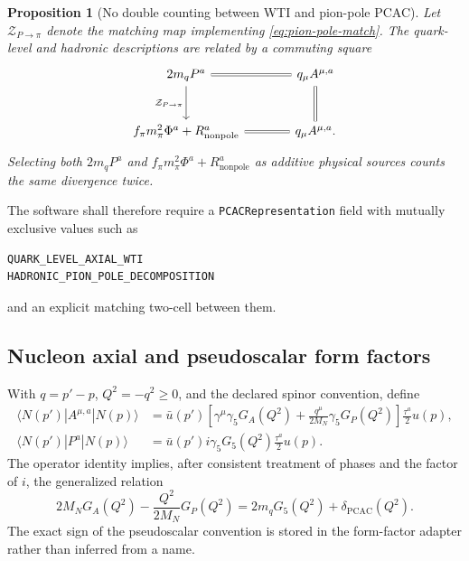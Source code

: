\documentclass[11pt]{article}
\newtheorem{proposition}[definition]{Proposition}
\newcommand{\cZ}{\mathcal Z}
\begin{document}
\begin{proposition}[No double counting between WTI and pion-pole PCAC]
Let \(\cZ_{P\to\pi}\) denote the matching map implementing
\cref{eq:pion-pole-match}.  The quark-level and hadronic descriptions are
related by a commuting square
\begin{equation}
\begin{tikzcd}[column sep=large,row sep=large]
 2m_q P^a \arrow[r,equal] \arrow[d,"\cZ_{P\to\pi}"']
 & q_{\mu}A^{\mu,a} \arrow[d,equal]\\
 f_{\pi}m_{\pi}^{2}\Phi^a+R_{\mathrm{nonpole}}^a
 \arrow[r,equal]
 & q_{\mu}A^{\mu,a}.
\end{tikzcd}
\end{equation}
Selecting both \(2m_qP^a\) and
\(f_{\pi}m_{\pi}^{2}\Phi^a+R_{\mathrm{nonpole}}^a\) as additive physical
sources counts the same divergence twice.
\end{proposition}

The software shall therefore require a
\texttt{PCACRepresentation} field with mutually exclusive values such as
\begin{verbatim}
QUARK_LEVEL_AXIAL_WTI
HADRONIC_PION_POLE_DECOMPOSITION
\end{verbatim}
and an explicit matching two-cell between them.

\subsection{Nucleon axial and pseudoscalar form factors}

With \(q=p'-p\), \(Q^2=-q^2\ge0\), and the declared spinor convention,
define
\begin{align}
 \langle N(p')|A^{\mu,a}|N(p)\rangle
 &={}
 \bar u(p')
 \left[
 \gamma^{\mu}\gamma_5 G_A(Q^2)
 +\frac{q^{\mu}}{2M_N}\gamma_5 G_P(Q^2)
 \right]
 \frac{\tau^a}{2}u(p),
 \\
 \langle N(p')|P^a|N(p)\rangle
 &={}
 \bar u(p')i\gamma_5
 G_5(Q^2)
 \frac{\tau^a}{2}u(p).
 \label{eq:axial-form-factors}
\end{align}
The operator identity implies, after consistent treatment of phases and the
factor of \(i\), the generalized relation
\begin{equation}
 2M_N G_A(Q^2)
 -\frac{Q^2}{2M_N}G_P(Q^2)
 =2m_q G_5(Q^2)
 +\delta_{\mathrm{PCAC}}(Q^2).
 \label{eq:formfactor-pcac}
\end{equation}
The exact sign of the pseudoscalar convention is stored in the form-factor
adapter rather than inferred from a name.
\end{document}
